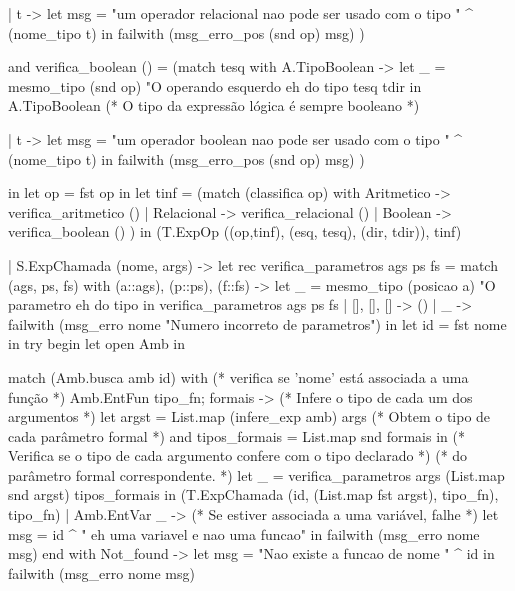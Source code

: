 \documentclass[12pt,a4paper,twoside]{report}
\begin{document}
\begin{terminal}
       | t -> let msg = "um operador relacional nao pode ser usado com o tipo " ^
                        (nome_tipo t)
         in failwith (msg_erro_pos (snd op) msg)
      )

    and verifica_boolean () =
      (match tesq with
         A.TipoBoolean ->
         let _ = mesmo_tipo (snd op)
                   "O operando esquerdo eh do tipo %
                   tesq tdir
         in A.TipoBoolean (* O tipo da expressão lógica é sempre booleano *)

       | t -> let msg = "um operador boolean nao pode ser usado com o tipo " ^
                        (nome_tipo t)
              in failwith (msg_erro_pos (snd op) msg)
      )
    
    in
    let op = fst op in
    let tinf = (match (classifica op) with
          Aritmetico -> verifica_aritmetico ()
        | Relacional -> verifica_relacional ()
        | Boolean -> verifica_boolean ()
      )
    in
      (T.ExpOp ((op,tinf), (esq, tesq), (dir, tdir)), tinf)

    | S.ExpChamada (nome, args) ->
     let rec verifica_parametros ags ps fs =
        match (ags, ps, fs) with
         (a::ags), (p::ps), (f::fs) ->
            let _ = mesmo_tipo (posicao a)
                     "O parametro eh do tipo %
            in verifica_parametros ags ps fs
       | [], [], [] -> ()
       | _ -> failwith (msg_erro nome "Numero incorreto de parametros")
     in
     let id = fst nome in
     try
       begin
         let open Amb in

         match (Amb.busca amb id) with
         (* verifica se 'nome' está associada a uma função *)
           Amb.EntFun {tipo_fn; formais} ->
           (* Infere o tipo de cada um dos argumentos *)
           let argst = List.map (infere_exp amb) args
           (* Obtem o tipo de cada parâmetro formal *)
           and tipos_formais = List.map snd formais in
           (* Verifica se o tipo de cada argumento confere com o tipo declarado *)
           (* do parâmetro formal correspondente.                               *)
           let _ = verifica_parametros args (List.map snd argst) tipos_formais
            in (T.ExpChamada (id, (List.map fst argst), tipo_fn), tipo_fn)
         | Amb.EntVar _ -> (* Se estiver associada a uma variável, falhe *)
           let msg = id ^ " eh uma variavel e nao uma funcao" in
           failwith (msg_erro nome msg)
       end
     with Not_found ->
       let msg = "Nao existe a funcao de nome " ^ id in
       failwith (msg_erro nome msg)


\end{terminal}
\end{document}
